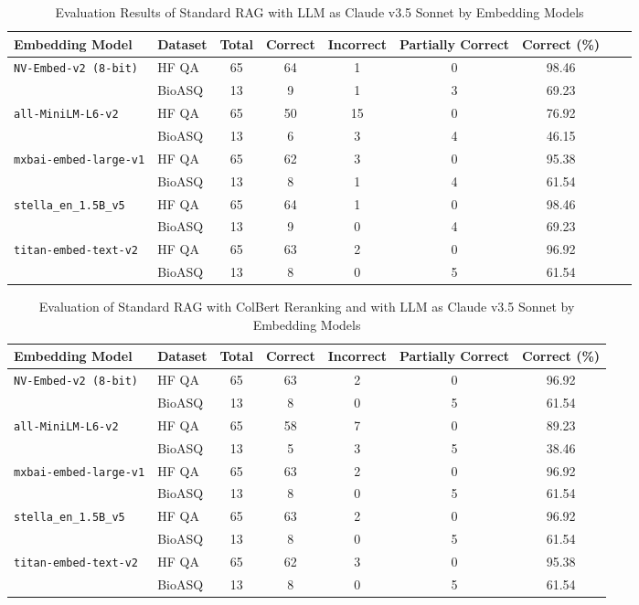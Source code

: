 \documentclass{scrartcl}
\begin{document}
\begin{table}[H]
\centering
\small
\begin{tabular}{l l c c c c c c c}
\hline

\textbf{Embedding Model} & \textbf{Dataset} & \textbf{Total} & \textbf{Correct} & \textbf{Incorrect} & \textbf{Partially Correct} & \textbf{Correct (\%)}  \\
\hline
\multirow{2}{*}{\texttt{NV-Embed-v2 (8-bit)}} 
 & HF QA  & 65 & 64 & 1 & 0 & 98.46 \\
 & BioASQ & 13 & 9  & 1 & 3 & 69.23 \\
\hline
\multirow{2}{*}{\texttt{all-MiniLM-L6-v2}} 
 & HF QA  & 65 & 50 & 15 & 0 & 76.92 \\
 & BioASQ & 13 & 6  & 3 & 4 & 46.15  \\
\hline
\multirow{2}{*}{\texttt{mxbai-embed-large-v1}} 
 & HF QA  & 65 & 62 & 3 & 0 & 95.38 \\
 & BioASQ & 13 & 8  & 1 & 4 & 61.54 \\
\hline
\multirow{2}{*}{\texttt{stella\_en\_1.5B\_v5}} 
 & HF QA  & 65 & 64 & 1 & 0 & 98.46 \\
 & BioASQ & 13 & 9  & 0 & 4 & 69.23 \\
\hline
\multirow{2}{*}{\texttt{titan-embed-text-v2}} 
 & HF QA  & 65 & 63 & 2 & 0 & 96.92 \\
 & BioASQ & 13 & 8  & 0 & 5 & 61.54\\
\hline
\end{tabular}
\caption{Evaluation Results of Standard RAG with LLM as Claude v3.5 Sonnet by Embedding Models }
\end{table}

\begin{table}[H]
\centering
\small
\begin{tabular}{l l c c c c c}
\hline
\textbf{Embedding Model} & \textbf{Dataset} & \textbf{Total} & \textbf{Correct} & \textbf{Incorrect} & \textbf{Partially Correct} & \textbf{Correct (\%)} \\
\hline
\multirow{2}{*}{\texttt{NV-Embed-v2 (8-bit)}} 
 & HF QA  & 65 & 63 & 2 & 0 & 96.92 \\
 & BioASQ & 13 & 8  & 0 & 5 & 61.54 \\
\hline
\multirow{2}{*}{\texttt{all-MiniLM-L6-v2}} 
 & HF QA  & 65 & 58 & 7 & 0 & 89.23 \\
 & BioASQ & 13 & 5  & 3 & 5 & 38.46 \\
\hline
\multirow{2}{*}{\texttt{mxbai-embed-large-v1}} 
 & HF QA  & 65 & 63 & 2 & 0 & 96.92 \\
 & BioASQ & 13 & 8  & 0 & 5 & 61.54 \\
\hline
\multirow{2}{*}{\texttt{stella\_en\_1.5B\_v5}} 
 & HF QA  & 65 & 63 & 2 & 0 & 96.92 \\
 & BioASQ & 13 & 8  & 0 & 5 & 61.54 \\
\hline
\multirow{2}{*}{\texttt{titan-embed-text-v2}} 
 & HF QA  & 65 & 62 & 3 & 0 & 95.38 \\
 & BioASQ & 13 & 8  & 0 & 5 & 61.54 \\
\hline
\end{tabular}
\caption{Evaluation of Standard RAG with ColBert Reranking and with LLM as Claude v3.5 Sonnet by Embedding Models}
\end{table}
\end{document}
